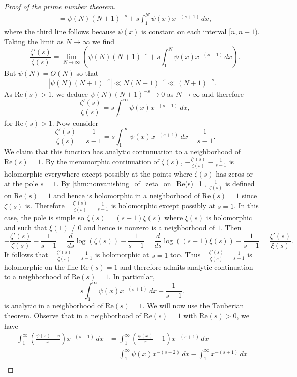 \documentclass[12pt]{book}
\theoremstyle{definition}\newframedtheorem{method}{Method}
\newcommand{\z}{\zeta}
\newcommand{\<}{\langle}
\renewcommand{\>}{\rangle}
\renewcommand{\Re}{\mathrm{Re}}
\begin{document}
\begin{proof}[Proof of the prime number theorem]
\begin{align*}
          &= \psi(N)(N+1)^{-s}+s\int_{1}^{N}\psi(x)x^{-(s+1)}\,dx,
        \end{align*}
        where the third line follows because $\psi(x)$ is constant on each interval $[n,n+1)$. Taking the limit as $N \to \infty$ we find
        \[
          -\frac{\z'(s)}{\z(s)} = \lim_{N \to \infty}\left(\psi(N)(N+1)^{-s}+s\int_{1}^{N}\psi(x)x^{-(s+1)}\,dx\right).
        \]
        But $\psi(N) = O(N)$ so that
        \[
          |\psi(N)(N+1)^{-s}| \ll N(N+1)^{-s} \ll (N+1)^{-s}.
        \]
        As $\Re(s) > 1$, we deduce $\psi(N)(N+1)^{-s} \to 0$ as $N \to \infty$ and therefore
        \[
          -\frac{\z'(s)}{\z(s)} = s\int_{1}^{\infty}\psi(x)x^{-(s+1)}\,dx,
        \]
        for $\Re(s) > 1$. Now consider
        \[
          -\frac{\z'(s)}{\z(s)}-\frac{1}{s-1} = s\int_{1}^{\infty}\psi(x)x^{-(s+1)}\,dx-\frac{1}{s-1}.
        \]
        We claim that this function has analytic contunuation to a neighborhood of $\Re(s) = 1$. By the meromorphic continuation of $\z(s)$, $-\frac{\z'(s)}{\z(s)}-\frac{1}{s-1}$ is holomorphic everywhere except possibly at the points where $\z(s)$ has zeros or at the pole $s = 1$. By \cref{thm:nonvanishing_of_zeta_on_Re(s)=1}, $\frac{1}{\z(s)}$ is defined on $\Re(s) = 1$ and hence is holomorphic in a neighborhood of $\Re(s) = 1$ since $\z(s)$ is. Therefore $-\frac{\z'(s)}{\z(s)}-\frac{1}{s-1}$ is holomorphic except possibly at $s = 1$. In this case, the pole is simple so $\z(s) = (s-1)\xi(s)$ where $\xi(s)$ is holomorphic and such that $\xi(1) \neq 0$ and hence is nonzero is a neighborhood of $1$. Then
        \[
          -\frac{\z'(s)}{\z(s)}-\frac{1}{s-1} = \frac{d}{ds}\log(\z(s))-\frac{1}{s-1} = \frac{d}{ds}\log((s-1)\xi(s))-\frac{1}{s-1} = \frac{\xi'(s)}{\xi(s)}.
        \]
        It follows that $-\frac{\z'(s)}{\z(s)}-\frac{1}{s-1}$ is holomorphic at $s = 1$ too. Thus $-\frac{\z'(s)}{\z(s)}-\frac{1}{s-1}$ is holomorphic on the line $\Re(s) = 1$ and therefore admits analytic continuation to a neighborhood of $\Re(s) = 1$. In particular,
        \[
          s\int_{1}^{\infty}\psi(x)x^{-(s+1)}\,dx-\frac{1}{s-1}.
        \]
        is analytic in a neighborhood of $\Re(s) = 1$. We will now use the Tauberian theorem. Observe that in a neighborhood of $\Re(s) = 1$ with $\Re(s) > 0$, we have
        \begin{align*}
          \int_{1}^{\infty}\left(\frac{\psi(x)-x}{x}\right)x^{-(s+1)}\,dx &= \int_{1}^{\infty}\left(\frac{\psi(x)}{x}-1\right)x^{-(s+1)}\,dx \\
          &= \int_{1}^{\infty}\psi(x)x^{-(s+2)}\,dx-\int_{1}^{\infty}x^{-(s+1)}\,dx \\

\end{align*}
\end{proof}
\end{document}
